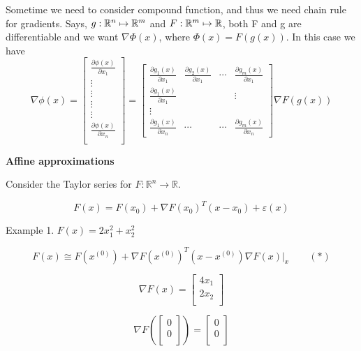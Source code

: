 Sometime  we need to consider compound function, and thus we need chain rule for gradients. Says, $g:\mathbb{R}^{n}\mapsto\mathbb{R}^{m}$ and $F:\mathbb{R}^{m}\mapsto\mathbb{R}$, both F and g are differentiable and we want $\nabla\Phi (x)$, where $\Phi (x)=F(g(x))$. In this case we have
$$
\nabla \phi (x)
=
\left[\begin{matrix}
	\frac{\partial \phi (x)}{\partial x_{1}}\\
	\vdots\\
	\vdots\\
	\vdots\\
	\vdots\\
	\frac{\partial \phi (x)}{\partial x_{n}}\\
\end{matrix}\right]
=
\left[\begin{matrix}
	\frac{\partial g_{1}(x)}{\partial x_{1}}&\frac{\partial g_{2}(x)}{\partial x_{1}}&\cdots&\frac{\partial g_{m}(x)}{\partial x_{1}}\\
	\frac{\partial g_{1}(x)}{\partial x_{1}}& & &\vdots\\
	\vdots& & & \\
	\frac{\partial g_{1}(x)}{\partial x_{n}}&\cdots&\cdots&\frac{\partial g_{m}(x)}{\partial x_{n}}
\end{matrix}\right]
\nabla F(g(x))
$$


\vspace{0.5cm}
\textbf{Affine approximations}

Consider the Taylor series for $F\colon \mathbb{R}^n \to \mathbb{R}$.

$$F(x) = F(x_0) + \nabla F(x_0)^{T} (x - x_0) + \varepsilon (x) $$


Example 1. $F(x) = 2 x_1^2 + x_2^2$

$$F(x) \cong F(x^{(0)}) + \nabla F(x^{(0)})^{T} (x - x^{(0)})
\left. \nabla F(x) \right|_{x} \qquad (*)$$

$$\nabla F(x) = \begin{bmatrix} 4x_1\\ 2x_2\\ \end{bmatrix}$$

\begin{displaymath}
\nabla F \left( \begin{bmatrix} 0\\ 0\\ \end{bmatrix} \right)  =
\begin{bmatrix} 0\\ 0\\ \end{bmatrix}
\end{displaymath}


